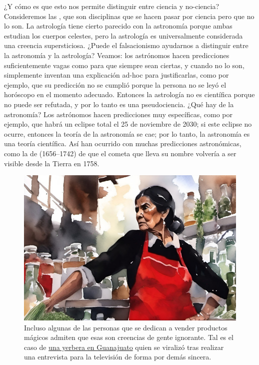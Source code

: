 ¿Y cómo es que esto nos permite distinguir entre ciencia y no-ciencia?
Consideremos las , que son
disciplinas que se hacen pasar por ciencia pero que no lo son.
La astrología tiene cierto parecido con la astronomía porque ambas estudian los
cuerpos celestes, pero la astrología es universalmente considerada una creencia
supersticiosa.
¿Puede el falsacionismo ayudarnos a distinguir entre la astronomía y la
astrología?
Veamos: los astrónomos hacen predicciones suficientemente vagas como para que
siempre sean ciertas, y cuando no lo son, simplemente inventan una explicación
ad-hoc para justificarlas, como por ejemplo, que su predicción no se cumplió
porque la persona no se leyó el horóscopo en el momento adecuado.
Entonces la astrología no es científica porque no puede ser refutada, y por lo
tanto es una pseudociencia.
¿Qué hay de la astronomía?
Los astrónomos hacen predicciones muy específicas, como por ejemplo, que habrá
un eclipse total el 25 de noviembre de 2030; si este eclipse no ocurre, entonces
la teoría de la astronomía se cae; por lo tanto, la astronomía es una teoría
científica.
Así han ocurrido con muchas predicciones astronómicas, como la de
 (1656--1742) de que el cometa que lleva su
nombre volvería a ser visible desde la Tierra en 1758.

\begin{figure}[ht]
    \centering
    \includegraphics[width=0.8\linewidth]{img/creenciasdegente}
    \caption{Incluso algunas de las personas que se dedican a vender productos
        mágicos admiten que esas son creencias de gente ignorante.
        Tal es el caso de %
        \href{https://eldeforma.com/2020/04/08/mujer-explota-quedate-en-casa-quien-me-mantiene-huevos-para-curar/}%
        {una yerbera en Guanajuato} quien se viralizó tras
        realizar una entrevista para la televisión de forma por demás
        sincera.}
\end{figure}

